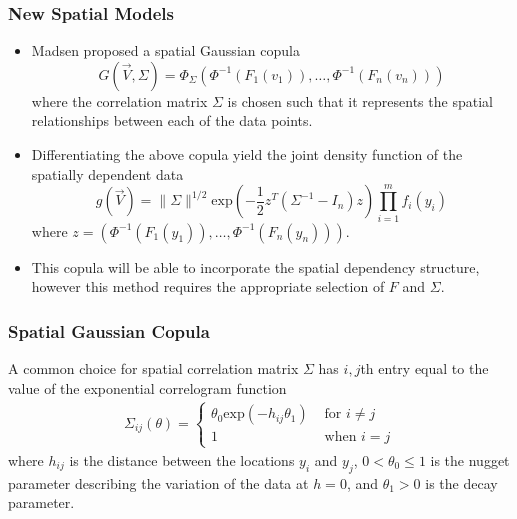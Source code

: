 \documentclass{beamer}
\begin{document}
\begin{frame}
	\frametitle{New Spatial Models}
	\begin{itemize}
	\item Madsen\cite{madsen09} proposed a spatial Gaussian copula
	$$
	G(\vec{V}, \Sigma) = \Phi_{\Sigma}(\Phi^{-1}(F_1(v_1)), \ldots, \Phi^{-1}(F_n(v_n)))
	$$
	where the correlation matrix $\Sigma$ is chosen such that it represents the spatial relationships between each of the data points.
	\item Differentiating the above copula yield the joint density function of the spatially dependent data
	$$
	g(\vec{V}) = \| \Sigma \|^{1/2} \text{exp}\left(-\frac{1}{2} z^T (\Sigma^{-1} - I_n) z\right) \prod_{i = 1}^m f_i(y_i)
	$$
where $z = (\Phi^{-1}(F_1(y_1)), \ldots, \Phi^{-1}(F_n(y_n)))$.
	\item This copula will be able to incorporate the spatial dependency structure, however this method requires the appropriate selection of $F$ and $\Sigma$.
	\end{itemize}
\end{frame}

\begin{frame}
	\frametitle{Spatial Gaussian Copula}
	A common choice for spatial correlation matrix $\Sigma$ has $i,j$th entry equal to the value of the exponential correlogram function
	\begin{align*}
	\Sigma_{ij}(\theta) = 
		\begin{cases}
			\theta_0 \text{exp}(-h_{ij} \theta_1) & \text{ for } i \neq j\\
			1 & \text{ when } i = j
		\end{cases}
	\end{align*}
where $h_{ij}$ is the distance between the locations $y_i$ and $y_j$, $0 < \theta_0 \leq 1$ is the nugget parameter describing the variation of the data at $h = 0$, and $\theta_1 > 0$ is the decay parameter.
\end{frame}
\end{document}
